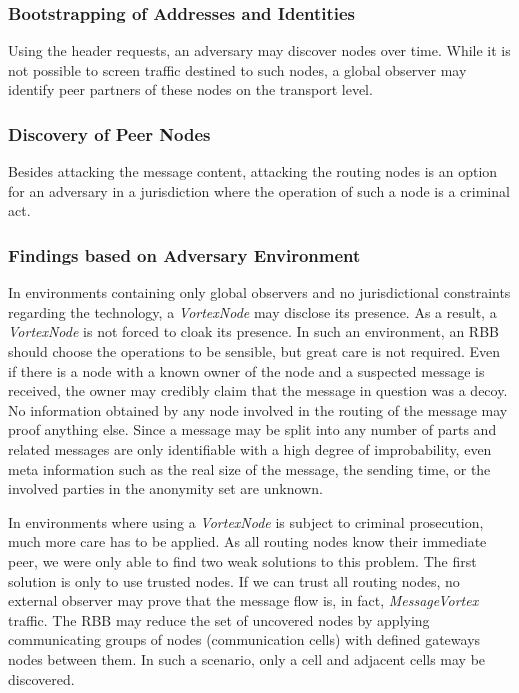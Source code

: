 \documentclass[acmsmall, screen]{acmart}
\begin{document}
\subsubsection{Bootstrapping of Addresses and Identities}
Using the header requests, an adversary may discover nodes over time. While it is not possible to screen traffic destined to such nodes, a global observer may identify peer partners of these nodes on the transport level.

\subsubsection{Discovery of Peer Nodes}
Besides attacking the message content, attacking the routing nodes is an option for an adversary in a jurisdiction where the operation of such a node is a criminal act. 

\subsubsection{Findings based on Adversary Environment}
In environments containing only global observers and no jurisdictional constraints regarding the technology, a \emph{VortexNode} may disclose its presence. As a result, a \emph{VortexNode} is not forced to cloak its presence. In such an environment, an RBB should choose the operations to be sensible, but great care is not required. Even if there is a node with a known owner of the node and a suspected message is received, the owner may credibly claim that the message in question was a decoy. No information obtained by any node involved in the routing of the message may proof anything else. Since a message may be split into any number of parts and related messages are only identifiable with a high degree of improbability, even meta information such as the real size of the message, the sending time, or the involved parties in the anonymity set are unknown. %

In environments where using a \emph{VortexNode} is subject to criminal prosecution, much more care has to be applied. As all routing nodes know their immediate peer, we were only able to find two weak solutions to this problem. The first solution is only to use trusted nodes. If we can trust all routing nodes, no external observer may prove that the message flow is, in fact, \emph{MessageVortex} traffic. The RBB may reduce the set of uncovered nodes by applying communicating groups of nodes (communication cells) with defined gateways nodes between them. In such a scenario, only a cell and adjacent cells may be discovered.
\end{document}
